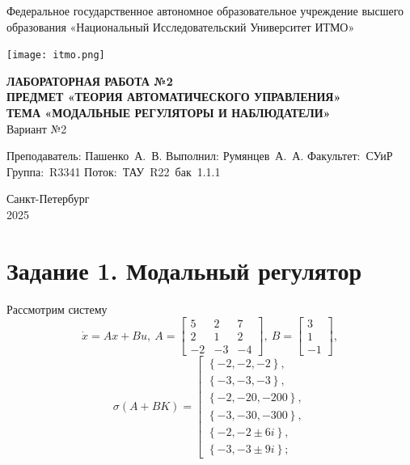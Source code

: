 \documentclass[a4paper, 12pt]{article}
\begin{document}
    \begin{titlepage}

        \begin{center}
        Федеральное государственное автономное образовательное учреждение высшего образования
        «Национальный Исследовательский Университет ИТМО»
        \vfill
        
        \texttt{[image: itmo.png]} %

        {\large\bf ЛАБОРАТОРНАЯ РАБОТА №2}\\
        {\large\bf ПРЕДМЕТ «ТЕОРИЯ АВТОМАТИЧЕСКОГО УПРАВЛЕНИЯ»}\\
        {\large\bf ТЕМА «МОДАЛЬНЫЕ РЕГУЛЯТОРЫ И НАБЛЮДАТЕЛИ»}\\
        Вариант №2
        \vfill

        \begin{flushright}
            \begin{minipage}{.45\textwidth}
            {
                \hbox{Преподаватель:}
                \hbox{Пашенко А. В.}
                \hbox{}
                \hbox{Выполнил:}
                \hbox{Румянцев А. А.}
                \hbox{}
                \hbox{Факультет: СУиР}
                \hbox{Группа: R3341}
                \hbox{Поток: ТАУ R22 бак 1.1.1}
            }
            \end{minipage}
        \end{flushright}
        \vfill
  
        Санкт-Петербург\\
        2025
        \end{center}
    \end{titlepage}
    
    \tableofcontents

    \newpage
    \section{Задание 1. Модальный регулятор}
    Рассмотрим систему
    $$
    \dot{x}=Ax+Bu,\ A=\begin{bmatrix}
        5 &2 &7\\
        2 &1 &2\\
        -2 &-3 &-4
    \end{bmatrix},\ B=\begin{bmatrix}
        3\\
        1\\
        -1
    \end{bmatrix},
    $$
    $$
    \sigma\left(A+BK\right)= 
    \left[ 
      \begin{gathered} 
        \left\{-2,-2,-2\right\}, \\ 
        \left\{-3,-3,-3\right\}, \\
        \left\{-2,-20,-200\right\},\\
        \left\{-3,-30,-300\right\},\\
        \left\{-2,-2\pm6i\right\},\\
        \left\{-3,-3\pm9i\right\};
      \end{gathered} 
\right.
    $$
\end{document}
